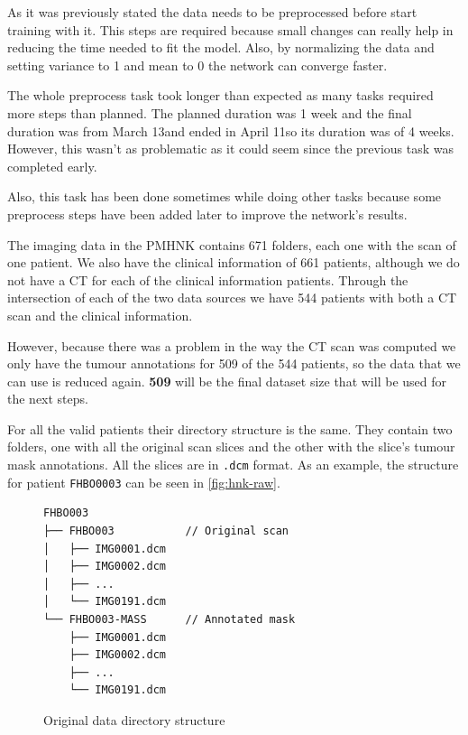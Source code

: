 



As it was previously stated the data needs to be preprocessed before start training with it.
This steps are required because small changes can really help in reducing the time needed to
fit the model. Also, by normalizing the data and setting variance to 1 and mean to 0 the network
can converge faster.
~\cite{neural:efficient-backprop}

The whole preprocess task took longer than expected as many tasks required more steps than 
planned. The planned duration was 1 week and the final duration was from March 13\Th and
ended in April 11\Th so its duration was of 4 weeks. However, this wasn't as problematic as 
it could seem since the previous task was completed early.

Also, this task has been done sometimes while doing other tasks because some preprocess 
steps have been added later to improve the network's results.


The imaging data in the \Gls{PMHNK} contains 671 folders, each one with the scan of one patient. 
We also have the clinical information of 661 patients, although we do not have a \gls{CT} for
each of the clinical information patients. Through the intersection of each of the two data
sources we have 544 patients with both a \gls{CT} scan and the clinical information.

However, because there was a problem in the way the \gls{CT} scan was computed we only have
the tumour annotations for 509 of the 544 patients, so the data that we can use is reduced
again. \textbf{509} will be the final dataset size that will be used for the next 
steps.

For all the valid patients their directory structure is the same. They contain two folders,
one with all the original scan slices and the other with the slice's tumour mask annotations. 
All the slices are in \verb|.dcm| format.
As an example, the structure for patient \texttt{FHBO0003} can be seen in \autoref{fig:hnk-raw}.

\begin{figure}
  \centering
  \begin{minipage}{0.8\textwidth}
    \begin{Verbatim}[samepage=true]
FHBO003
├── FHBO003           // Original scan
│   ├── IMG0001.dcm
│   ├── IMG0002.dcm
│   ├── ...
│   └── IMG0191.dcm
└── FHBO003-MASS      // Annotated mask
    ├── IMG0001.dcm
    ├── IMG0002.dcm
    ├── ...
    └── IMG0191.dcm
    \end{Verbatim}
  \end{minipage}
    
  \caption{Original data directory structure \label{fig:hnk-raw}}
\end{figure}

